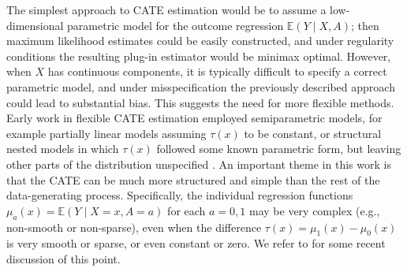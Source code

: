 \documentclass[11pt,twoside]{article}
\newcommand{\E}{\mathbb{E}}
\theoremstyle{definition}
\theoremstyle{remark}
\begin{document}
The simplest approach to CATE estimation would be to assume a low-dimensional parametric model for the outcome regression $\E(Y \mid X,A)$; then maximum likelihood estimates could be easily constructed, and under regularity conditions the resulting plug-in estimator would be minimax optimal. However, when $X$ has continuous components, it is typically difficult to specify a correct parametric model, and under misspecification the previously described approach could lead to substantial bias. This suggests the need for more flexible methods. Early work in flexible CATE estimation employed semiparametric models, for example partially linear models  assuming $\tau(x)$ to be constant, or structural nested models in which $\tau(x)$ followed some known parametric form, but leaving other parts of the distribution unspecified \citep{robinson1988root, robins1992estimating, robins1994correcting, van2003unified, van2006statistical, vansteelandt2014structural}. An important theme in this work is that the CATE can be much more structured and simple than the rest of the data-generating process. Specifically, the individual regression functions $\mu_a(x) = \E(Y \mid X=x,A=a)$ for each $a=0,1$ may be very complex (e.g., non-smooth or non-sparse), even when the difference $\tau(x) = \mu_1(x) - \mu_0(x)$ is very smooth or sparse, or even constant or zero. We refer to \citet{kennedy2023towards} for some recent discussion of this point. \\

\end{document}
